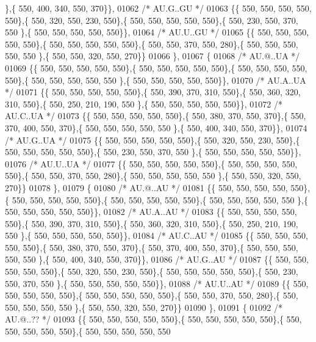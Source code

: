 \begin{DoxyCode}
      \},\{ 550, 400, 340, 550, 370\}\},
01062 \textcolor{comment}{/* AU.G..GU */}
01063 \{\{ 550, 550, 550, 550, 550\},\{ 550, 320, 550, 230, 550\},\{ 550, 550, 550, 550, 550\},\{ 550, 230, 550, 370, 550
      \},\{ 550, 550, 550, 550, 550\}\},
01064 \textcolor{comment}{/* AU.U..GU */}
01065 \{\{ 550, 550, 550, 550, 550\},\{ 550, 550, 550, 550, 550\},\{ 550, 550, 370, 550, 280\},\{ 550, 550, 550, 550, 550
      \},\{ 550, 550, 320, 550, 270\}\}
01066 \},
01067 \{
01068 \textcolor{comment}{/* AU.@..UA */}
01069 \{\{ 550, 550, 550, 550, 550\},\{ 550, 550, 550, 550, 550\},\{ 550, 550, 550, 550, 550\},\{ 550, 550, 550, 550, 550
      \},\{ 550, 550, 550, 550, 550\}\},
01070 \textcolor{comment}{/* AU.A..UA */}
01071 \{\{ 550, 550, 550, 550, 550\},\{ 550, 390, 370, 310, 550\},\{ 550, 360, 320, 310, 550\},\{ 550, 250, 210, 190, 550
      \},\{ 550, 550, 550, 550, 550\}\},
01072 \textcolor{comment}{/* AU.C..UA */}
01073 \{\{ 550, 550, 550, 550, 550\},\{ 550, 380, 370, 550, 370\},\{ 550, 370, 400, 550, 370\},\{ 550, 550, 550, 550, 550
      \},\{ 550, 400, 340, 550, 370\}\},
01074 \textcolor{comment}{/* AU.G..UA */}
01075 \{\{ 550, 550, 550, 550, 550\},\{ 550, 320, 550, 230, 550\},\{ 550, 550, 550, 550, 550\},\{ 550, 230, 550, 370, 550
      \},\{ 550, 550, 550, 550, 550\}\},
01076 \textcolor{comment}{/* AU.U..UA */}
01077 \{\{ 550, 550, 550, 550, 550\},\{ 550, 550, 550, 550, 550\},\{ 550, 550, 370, 550, 280\},\{ 550, 550, 550, 550, 550
      \},\{ 550, 550, 320, 550, 270\}\}
01078 \},
01079 \{
01080 \textcolor{comment}{/* AU.@..AU */}
01081 \{\{ 550, 550, 550, 550, 550\},\{ 550, 550, 550, 550, 550\},\{ 550, 550, 550, 550, 550\},\{ 550, 550, 550, 550, 550
      \},\{ 550, 550, 550, 550, 550\}\},
01082 \textcolor{comment}{/* AU.A..AU */}
01083 \{\{ 550, 550, 550, 550, 550\},\{ 550, 390, 370, 310, 550\},\{ 550, 360, 320, 310, 550\},\{ 550, 250, 210, 190, 550
      \},\{ 550, 550, 550, 550, 550\}\},
01084 \textcolor{comment}{/* AU.C..AU */}
01085 \{\{ 550, 550, 550, 550, 550\},\{ 550, 380, 370, 550, 370\},\{ 550, 370, 400, 550, 370\},\{ 550, 550, 550, 550, 550
      \},\{ 550, 400, 340, 550, 370\}\},
01086 \textcolor{comment}{/* AU.G..AU */}
01087 \{\{ 550, 550, 550, 550, 550\},\{ 550, 320, 550, 230, 550\},\{ 550, 550, 550, 550, 550\},\{ 550, 230, 550, 370, 550
      \},\{ 550, 550, 550, 550, 550\}\},
01088 \textcolor{comment}{/* AU.U..AU */}
01089 \{\{ 550, 550, 550, 550, 550\},\{ 550, 550, 550, 550, 550\},\{ 550, 550, 370, 550, 280\},\{ 550, 550, 550, 550, 550
      \},\{ 550, 550, 320, 550, 270\}\}
01090 \},
01091 \{
01092 \textcolor{comment}{/* AU.@..?? */}
01093 \{\{ 550, 550, 550, 550, 550\},\{ 550, 550, 550, 550, 550\},\{ 550, 550, 550, 550, 550\},\{ 550, 550, 550, 550, 550

\end{DoxyCode}

